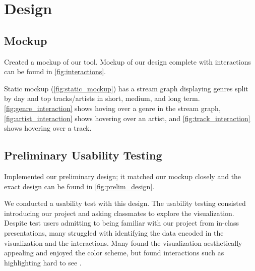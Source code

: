 \documentclass[journal]{vgtc}                %
\begin{document}

\section{Design}

\subsection{Mockup}

Created a mockup of our tool.
Mockup of our design complete with interactions can be found in \autoref{fig:interactions}. 



Static mockup (\autoref{fig:static_mockup}) has a stream graph displaying genres split by day and top tracks/artists in short, medium, and long term. \autoref{fig:genre_interaction} shows hoving over a genre in the stream graph, \autoref{fig:artist_interaction} shows hovering over an artist, and \autoref{fig:track_interaction} shows hovering over a track.


\subsection{Preliminary Usability Testing}

Implemented our preliminary design; it matched our mockup closely and the exact design can be found in \autoref{fig:prelim_design}.

We conducted a usability test with this design. The usability testing consisted introducing our project and asking classmates to explore the visualization. Despite test users admitting to being familiar with our project from in-class presentations, many struggled with identifying the data encoded in the visualization and the interactions. Many found the visualization aesthetically appealing and enjoyed the color scheme, but found interactions such as highlighting hard to see .   
\end{document}
